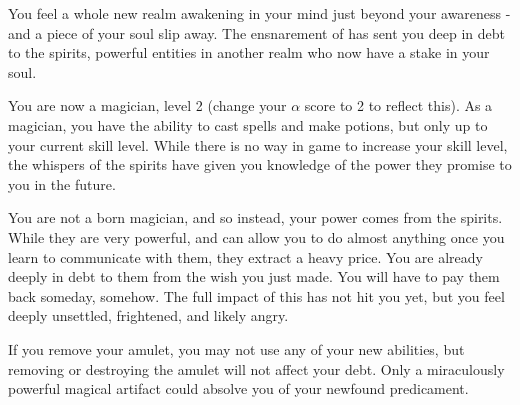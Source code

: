 \documentclass[green]{NeptuneBall}
\begin{document}
\name{\gSpirits{}}

You feel a whole new realm awakening in your mind just beyond your awareness - and a piece of your soul slip away. The ensnarement of \cWitch{} has sent you deep in debt to the spirits, powerful entities in another realm who now have a stake in your soul.

You are now a magician, level 2 (change your $\alpha$ score to 2 to reflect this). As a magician, you have the ability to cast spells and make potions, but only up to your current skill level. While there is no way in game to increase your skill level, the whispers of the spirits have given you knowledge of the power they promise to you in the future.

You are not a born magician, and so instead, your power comes from the spirits. While they are very powerful, and can allow you to do almost anything once you learn to communicate with them, they extract a heavy price. You are already deeply in debt to them from the wish you just made. You will have to pay them back someday, somehow. The full impact of this has not hit you yet, but you feel deeply unsettled, frightened, and likely angry.

If you remove your amulet, you may not use any of your new abilities, but removing or destroying the amulet will not affect your debt. Only a miraculously powerful magical artifact could absolve you of your newfound predicament.
\end{document}
